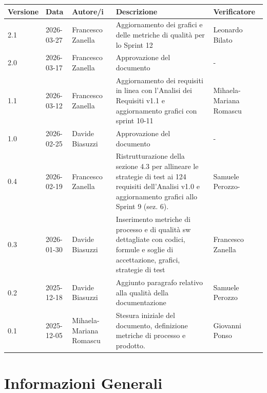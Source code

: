 \documentclass[a4paper,11pt,oneside]{scrartcl}
\begin{document}
\begin{center}
\renewcommand{\arraystretch}{1.5}
\begin{tabularx}{\textwidth}{@{}p{}p{}p{}X>{\centering\arraybackslash}p{}@{}}
\toprule
\textbf{Versione} & \textbf{Data} & \textbf{Autore/i} & \textbf{Descrizione} & \textbf{Verificatore} \\
\midrule
2.1 & 2026-03-27 & Francesco Zanella & Aggiornamento dei grafici e delle metriche di qualità per lo Sprint 12 & Leonardo Bilato\\
2.0 & 2026-03-17 & Francesco Zanella & Approvazione del documento & -\\
1.1 & 2026-03-12 & Francesco Zanella & Aggiornamento dei requisiti in linea con l'Analisi dei Requisiti v1.1 e aggiornamento grafici con sprint 10-11 & Mihaela-Mariana Romascu\\
1.0 & 2026-02-25 & Davide Biasuzzi & Approvazione del documento & -\\
0.4 & 2026-02-19 & Francesco Zanella & Ristrutturazione della sezione 4.3 per allineare le strategie di test ai 124 requisiti dell'Analisi v1.0 e aggiornamento grafici allo Sprint 9 (sez. 6). & Samuele Perozzo-\\
0.3 & 2026-01-30 & Davide Biasuzzi & Inserimento metriche di processo e di qualità sw dettagliate con codici, formule e soglie di accettazione, grafici, strategie di test & Francesco Zanella\\
0.2 & 2025-12-18 & Davide Biasuzzi & Aggiunto paragrafo relativo alla qualità della documentazione & Samuele Perozzo\\
0.1 & 2025-12-05 & Mihaela-Mariana Romascu & Stesura iniziale del documento, definizione metriche di processo e prodotto. & Giovanni Ponso\\
\bottomrule
\end{tabularx}
\end{center}

\newpage
\tableofcontents
\newpage

\section*{Informazioni Generali}
\end{document}
